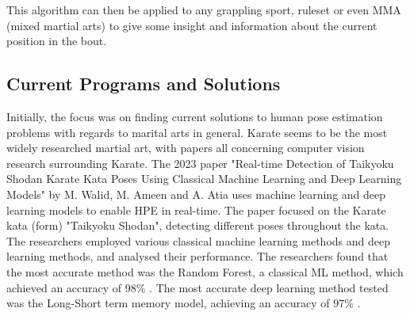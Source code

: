 \documentclass[a4paper, oneside, 11pt]{article}
\begin{document}
This algorithm can then be applied to any grappling sport, ruleset or even MMA (mixed martial arts) to give some insight and information about the current position in the bout.

\subsection{Current Programs and Solutions}

Initially, the focus was on finding current solutions to human pose estimation problems with regards to marital arts in general. Karate seems to be the most widely researched martial art, with papers \cite{KarateCombatPunchAnticipationBJJPaper} \cite{KarateKata} \cite{PsychomotorPerformanceKarateCombatBJJPaper} \cite{OpenPoseMAPresentationBJJPaper} all concerning computer vision research surrounding Karate. The 2023 paper "Real-time Detection of Taikyoku Shodan Karate Kata Poses Using Classical Machine Learning and Deep Learning Models" \cite{KarateKata} by M. Walid, M. Ameen and A. Atia uses machine learning and deep learning models to enable HPE in real-time. The paper focused on the Karate kata (form) "Taikyoku Shodan", detecting different poses throughout the kata. The researchers employed various classical machine learning methods and deep learning methods, and analysed their performance. The researchers found that the most accurate method was the Random Forest, a classical ML method, which achieved an accuracy of 98\% \cite{KarateKata}. The most accurate deep learning method tested was the Long-Short term memory model, achieving an accuracy of 97\% \cite{KarateKata}.
\end{document}
